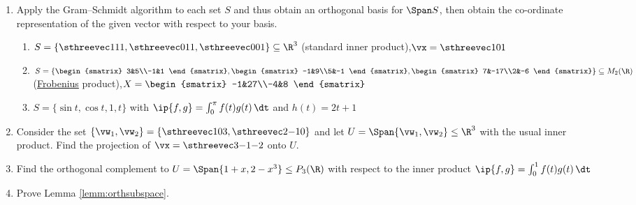   
\begin{exercises}
\begin{enumerate}[label=\thesubsection.\arabic*., align=right]  
  \item Apply the Gram--Schmidt algorithm to each set $S$ and thus obtain an orthogonal basis for $\Span S$, then obtain the co-ordinate representation of the given vector with respect to your basis.
  \begin{enumerate}
    \item $S=\left\{\sthreevec 111,\sthreevec 011,\sthreevec 001\right\}\subseteq\R^3$ (standard inner product),\quad $\vx=\sthreevec 101$
    \item $S=\left\{
    \begin{smatrix}
    3&5\\-1&1
    \end{smatrix},
    \begin{smatrix}
    -1&9\\5&-1
    \end{smatrix},
    \begin{smatrix}
    7&-17\\2&-6
    \end{smatrix}
    \right\}\subseteq M_2(\R)$ (\hyperref[ex:frobenius]{Frobenius} product),\qquad $X=\begin{smatrix}
    -1&27\\-4&8
    \end{smatrix}$
    \item $S=\{\sin t,\cos t,1,t\}$ with $\ip{f,g}=\int_0^\pi f(t)g(t)\,\dt$ and $h(t)=2t+1$
  \end{enumerate}
  
  \item Consider the set $\{\vw_1,\vw_2\}=\left\{\sthreevec 103,\sthreevec 2{-1}0\right\}$ and let $U=\Span\{\vw_1,\vw_2\}\le\R^3$ with the usual inner product. Find the projection of $\vx=\sthreevec 3{-1}{-2}$ onto $U$.
  
 	
 	\item Find the orthogonal complement to $U=\Span\{1+x,2-x^3\}\le P_3(\R)$ with respect to the inner product $\ip{f,g}=\int_0^1 f(t)g(t)\,\dt$
 	
 	
  \item Prove Lemma \ref{lemm:orthsubspace}.
    

\end{enumerate}
\end{exercises}
